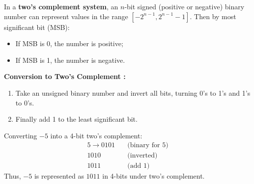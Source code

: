 \begin{Def}
    
    In a \textbf{two's complement system}, an $n$-bit signed (positive or negative) binary number can represent values in the range $[-2^{n-1}, 2^{n-1}-1]$. Then by most significant bit (MSB):
    \begin{itemize}
        \item If MSB is 0, the number is positive;
        \item If MSB is 1, the number is negative.
    \end{itemize}
    \noindent
    \textbf{Conversion to Two's Complement :}
    \begin{enumerate}
        \item Take an unsigned binary number and invert all bits, turning 0's to 1's and 1's to 0's.
        \item Finally add 1 to the least significant bit.
    \end{enumerate}
\end{Def}

\begin{Example}
    
    \noindent
    Converting $-5$ into a 4-bit two's complement:
    \begin{align*}
        5 \rightarrow 0101 \quad & \text{(binary for 5)} \\
         1010 \quad & \text{(inverted)} \\
         1011 \quad & \text{(add 1)}
    \end{align*}
    Thus, $-5$ is represented as $1011$ in 4-bits under two's complement.
\end{Example}
    